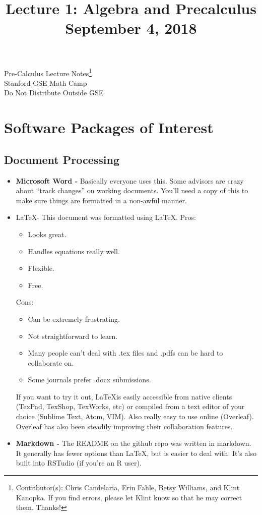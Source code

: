 \documentclass[11pt]{article}
\title{Lecture 1: Algebra and Precalculus \\ September 4, 2018}%
\theoremstyle{definition}
\theoremstyle{remark}
\begin{document}
\begin{center}
{\huge Pre-Calculus Lecture Notes\footnote{Contributor(s): Chris Candelaria, Erin Fahle, Betsy Williams, and Klint Kanopka. If you find errors, please let Klint know so that he may correct them. Thanks!}}\\[5pt]
{\Large Stanford GSE Math Camp \\[5pt]
Do Not Distribute Outside GSE}
\end{center}

\section{Software Packages of Interest}
    \subsection{Document Processing}
    	\begin{itemize}
        	\item \textbf{Microsoft Word - } Basically everyone uses this.  Some advisors are crazy about ``track changes'' on working documents.  You'll need a copy of this to make sure things are formatted in a non-awful manner. 
            \item \LaTeX - This document was formatted using \LaTeX.  
            Pros: 
            \begin{itemize}
                \item Looks great. 
                \item Handles equations really well.  
                \item Flexible.
                \item Free.  
            \end{itemize}
            Cons: 
            \begin{itemize}
                \item Can be extremely frustrating.
                \item Not straightforward to learn.
                \item Many people can't deal with .tex files and .pdfs can be hard to collaborate on.
                \item Some journals prefer .docx submissions.
            \end{itemize}
            If you want to try it out, \LaTeX is easily accessible from native clients (TexPad, TexShop, TexWorks, etc) or compiled from a text editor of your choice (Sublime Text, Atom, VIM).  Also really easy to use online (Overleaf). Overleaf has also been steadily improving their collaboration features.
            \item \textbf{Markdown - } The README on the github repo was written in markdown. It generally has fewer options than \LaTeX, but is easier to deal with. It's also built into RSTudio (if you're an R user).
        \end{itemize}
        
\end{document}
